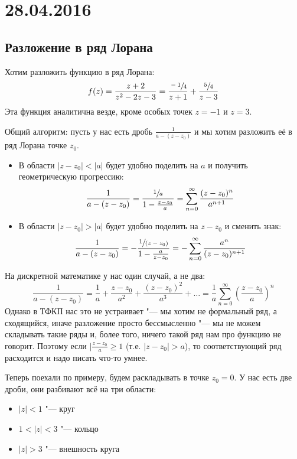 \chapter{28.04.2016}

\section{Разложение в ряд Лорана}
	Хотим разложить функцию в ряд Лорана:
	\[
		f(z) = \frac{z+2}{z^2-2z-3} = \frac{\sfrac{-1}4}{z+1} + \frac{\sfrac 54}{z-3}
	\]
	Эта функция аналитична везде, кроме особых точек $z=-1$ и $z=3$.

	Общий алгоритм: пусть у нас есть дробь $\frac{1}{a-(z-z_0)}$ и мы хотим разложить её в ряд Лорана точке $z_0$.
	\begin{itemize}
		\item
			В области $|z-z_0|<|a|$ будет удобно поделить на $a$ и получить геометрическую прогрессию:
			\[
				\frac{1}{a-(z-z_0)} = \frac{\sfrac 1a}{1-\frac{z-z_0}{a}} = \sum_{n=0}^{\infty} \frac{(z-z_0)^n}{a^{n+1}}
			\]
		\item
			В области $|z-z_0|>|a|$ будет удобно поделить на $z-z_0$ и сменить знак:
			\[
				\frac{1}{a-(z-z_0)} = - \frac{\sfrac 1{(z-z_0)}}{1-\frac{a}{z-z_0}} =
				- \sum_{n=0}^\infty \frac{a^n}{(z-z_0)^{n+1}}
			\]
	\end{itemize}
	\begin{Rem}
		На дискретной математике у нас один случай, а не два:
		\[
			\frac{1}{a-(z-z_0)} =
			\frac{1}{a} + \frac{z-z_0}{a^2} + \frac{(z-z_0)^2}{a^3} + \dots =
			\frac1a \sum_{n=0}^\infty \left(\frac{z-z_0}{a}\right)^n
		\]
		Однако в ТФКП нас это не устраивает "--- мы хотим не формальный ряд,
		а сходящийся, иначе разложение просто бессмысленно "--- мы не можем складывать такие ряды
		и, более того, ничего такой ряд нам про функцию не говорит.
		Поэтому если $|\frac{z-z_0}{a}\ge 1$ (т.е. $|z-z_0|>a$), то соответствующий ряд расходится
		и надо писать что-то умнее.
	\end{Rem}

	Теперь поехали по примеру, будем раскладывать в точке $z_0=0$.
	У нас есть две дроби, они разбивают всё на три области:
	\begin{itemize}
		\item $|z| < 1$ "--- круг
		\item $1 < |z| < 3$ "--- кольцо
		\item $|z| > 3$ "--- внешность круга
	\end{itemize}


